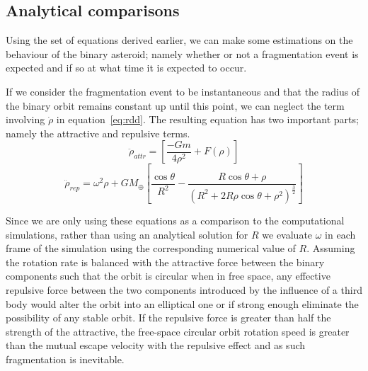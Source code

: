 \documentclass[letterpaper, preprint, paper,11pt]{AAS}	%
\begin{document}
\subsection{Analytical comparisons}

Using the set of equations derived earlier, we can make some estimations on the behaviour of the binary asteroid; namely whether or not a fragmentation event is expected and if so at what time it is expected to occur.

If we consider the fragmentation event to be instantaneous and that the radius of the binary orbit remains constant up until this point, we can neglect the term involving $\dot{\rho}$ in equation~\ref{eq:rdd}. The resulting equation has two important parts; namely the attractive and repulsive terms.
\begin{equation} \label{eq:attr}
\ddot{\rho}_{attr} = \left[\frac{-Gm}{4\rho^{2}}+F(\rho)\right]
\end{equation}
\begin{equation} \label{eq:rep}
\ddot{\rho}_{rep} = \omega^{2}\rho+{GM_\oplus}\left[\frac{\cos\theta}{R^{2}}-\frac{R\cos\theta+\rho}{(R^{2}+2R\rho\cos\theta+\rho^{2})^\frac{3}{2}}\right]
\end{equation}

Since we are only using these equations as a comparison to the computational simulations, rather than using an analytical solution for $R$ we evaluate $\omega$ in each frame of the simulation using the corresponding numerical value of $R$. Assuming the rotation rate is balanced with the attractive force between the binary components such that the orbit is circular when in free space, any effective repulsive force between the two components introduced by the influence of a third body would alter the orbit into an elliptical one or if strong enough eliminate the possibility of any stable orbit. If the repulsive force is greater than half the strength of the attractive, the free-space circular orbit rotation speed is greater than the mutual escape velocity with the repulsive effect and as such fragmentation is inevitable. 
\end{document}
